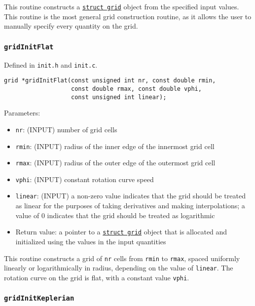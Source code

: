 \documentclass[12pt]{article}
\begin{document}
This routine constructs a \hyperref[sssec:datastructures]{\texttt{struct grid}} object from the specified input values. This routine is the most general grid construction routine, as it allows the user to manually specify every quantity on the grid.

\subsubsection{\texttt{gridInitFlat}}
\label{sssec:gridInitFlat}

Defined in \verb=init.h= and \verb=init.c=.

\begin{verbatim}
grid *gridInitFlat(const unsigned int nr, const double rmin, 
                   const double rmax, const double vphi, 
                   const unsigned int linear);
\end{verbatim}

Parameters:
\begin{itemize}
\item \texttt{nr}: (INPUT) number of grid cells
\item \texttt{rmin}: (INPUT) radius of the inner edge of the innermost grid cell
\item \texttt{rmax}: (INPUT) radius of the outer edge of the outermost grid cell
\item \texttt{vphi}: (INPUT) constant rotation curve speed
\item \texttt{linear}: (INPUT) a non-zero value indicates that the grid should be treated as linear for the purposes of taking derivatives and making interpolations; a value of 0 indicates that the grid should be treated as logarithmic
\item Return value: a pointer to a \hyperref[sssec:datastructures]{\texttt{struct grid}} object that is allocated and initialized using the values in the input quantities
\end{itemize}

This routine constructs a grid of \verb=nr= cells from \verb=rmin= to \verb=rmax=, spaced uniformly linearly or logarithmically in radius, depending on the value of \verb=linear=. The rotation curve on the grid is flat, with a constant value \verb=vphi=.

\subsubsection{\texttt{gridInitKeplerian}}
\label{sssec:gridInitKeplerian}
\end{document}
